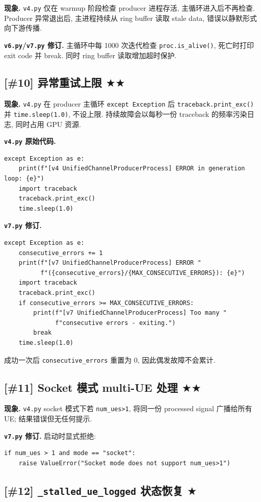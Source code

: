 \documentclass[11pt,a4paper,UTF8,fontset=fandol]{ctexart}
\newcommand{\sone}{\textcolor{starcolor}{$\bigstar$}}
\newcommand{\stwo}{\textcolor{starcolor}{$\bigstar\bigstar$}}
\newcommand{\vfour}{\texttt{v4.py}}
\newcommand{\vsix}{\texttt{v6.py}}
\newcommand{\vseven}{\texttt{v7.py}}
\newcommand{\bugitem}[3]{%
  \subsection{[\##1] #2 \hfill #3}%
  \vspace{-0.5em}%
}
\begin{document}
\textbf{现象.} \vfour{} 仅在 warmup 阶段检查 producer 进程存活,
主循环进入后不再检查. Producer 异常退出后, 主进程持续从 ring buffer 读取
stale data, 错误以静默形式向下游传播.

\textbf{\vsix/\vseven{} 修订.} 主循环中每 1000 次迭代检查 \texttt{proc.is\_alive()},
死亡时打印 exit code 并 break. 同时 ring buffer 读取增加超时保护.

\bugitem{10}{异常重试上限}{\stwo}

\textbf{现象.} \vfour{} 在 producer 主循环 \texttt{except Exception} 后
\texttt{traceback.print\_exc()} 并 \texttt{time.sleep(1.0)}, 不设上限.
持续故障会以每秒一份 traceback 的频率污染日志, 同时占用 GPU 资源.

\textbf{\vfour{} 原始代码.}
\begin{lstlisting}[caption={v4.py: lines 1880--1884}]
except Exception as e:
    print(f"[v4 UnifiedChannelProducerProcess] ERROR in generation loop: {e}")
    import traceback
    traceback.print_exc()
    time.sleep(1.0)
\end{lstlisting}

\textbf{\vseven{} 修订.}
\begin{lstlisting}[caption={v7.py: lines 2154--2164}]
except Exception as e:
    consecutive_errors += 1
    print(f"[v7 UnifiedChannelProducerProcess] ERROR "
          f"({consecutive_errors}/{MAX_CONSECUTIVE_ERRORS}): {e}")
    import traceback
    traceback.print_exc()
    if consecutive_errors >= MAX_CONSECUTIVE_ERRORS:
        print(f"[v7 UnifiedChannelProducerProcess] Too many "
              f"consecutive errors - exiting.")
        break
    time.sleep(1.0)
\end{lstlisting}
成功一次后 \texttt{consecutive\_errors} 重置为 0, 因此偶发故障不会累计.

\bugitem{11}{Socket 模式 multi-UE 处理}{\stwo}

\textbf{现象.} \vfour{} socket 模式下若 \texttt{num\_ues>1},
将同一份 processed signal 广播给所有 UE; 结果错误但无任何提示.

\textbf{\vseven{} 修订.} 启动时显式拒绝:
\begin{verbatim}
if num_ues > 1 and mode == "socket":
    raise ValueError("Socket mode does not support num_ues>1")
\end{verbatim}

\bugitem{12}{\texttt{\_stalled\_ue\_logged} 状态恢复}{\sone}
\end{document}

